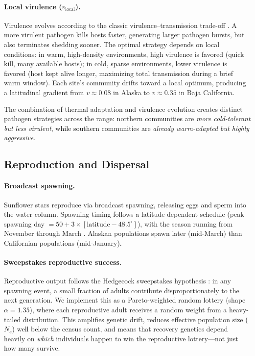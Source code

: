 \paragraph{Local virulence ($v_\mathrm{local}$).}
Virulence evolves according to the classic virulence--transmission trade-off
\citep{anderson1982}.  A more virulent pathogen kills hosts faster,
generating larger pathogen bursts, but also terminates shedding sooner.  The
optimal strategy depends on local conditions: in warm, high-density
environments, high virulence is favored (quick kill, many available hosts);
in cold, sparse environments, lower virulence is favored (host kept alive
longer, maximizing total transmission during a brief warm window).  Each
site's community drifts toward a local optimum, producing a latitudinal
gradient from $v \approx 0.08$ in Alaska to $v \approx 0.35$ in Baja
California.

The combination of thermal adaptation and virulence evolution creates
distinct pathogen strategies across the range: northern communities are
\textit{more cold-tolerant but less virulent}, while southern communities
are \textit{already warm-adapted but highly aggressive}.

\subsection{Reproduction and Dispersal}
\label{sec:reproduction}

\paragraph{Broadcast spawning.}
Sunflower stars reproduce via broadcast spawning, releasing eggs and sperm
into the water column.  Spawning timing follows a latitude-dependent
schedule (peak spawning day $= 50 + 3 \times [\text{latitude} - 48.5^{\circ}]$),
with the season running from November through March \citep{hodin2021}.
Alaskan populations spawn later (mid-March) than Californian populations
(mid-January).

\paragraph{Sweepstakes reproductive success.}
Reproductive output follows the Hedgecock sweepstakes hypothesis
\citep{hedgecock2011}: in any spawning event, a small fraction of adults
contribute disproportionately to the next generation.  We implement this
as a Pareto-weighted random lottery (shape $\alpha = 1.35$), where each
reproductive adult receives a random weight from a heavy-tailed distribution.
This amplifies genetic drift, reduces effective population size ($N_e$)
well below the census count, and means that recovery genetics depend
heavily on \textit{which} individuals happen to win the reproductive
lottery---not just how many survive.

